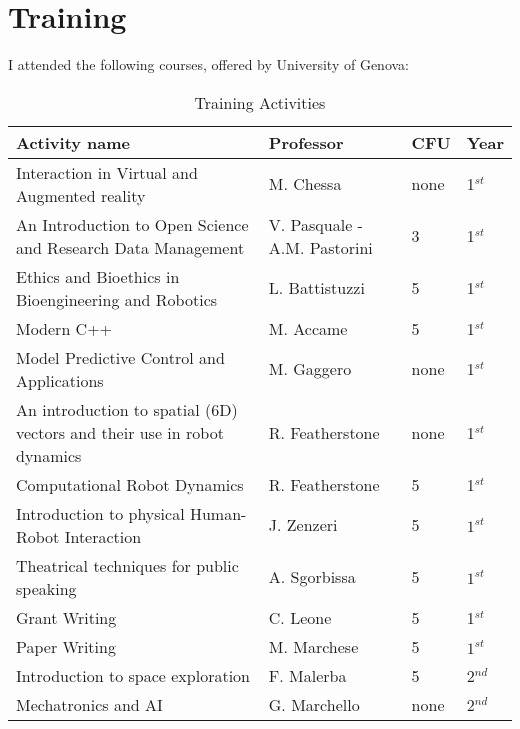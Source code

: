 \newpage
\section{Training}
I attended the following courses, offered by University of Genova:
\begin{table}[H]
	\begin{center}
		\renewcommand{\arraystretch}{1.3} %
		\setlength{\tabcolsep}{8pt} %
		\begin{tabular}{P{10cm} P{3cm} P{0.8cm} P{0.8cm}}
			\toprule
			\textbf{Activity name} & \textbf{Professor} & \textbf{CFU} & \textbf{Year} \\ 
			\midrule
			Interaction in Virtual and Augmented reality & M. Chessa & none & 1$^{st}$ \\
			\midrule
			An Introduction to Open Science and Research Data Management & V. Pasquale - A.M. Pastorini & 3 & 1$^{st}$ \\ 
			\midrule
			Ethics and Bioethics in Bioengineering and Robotics & L. Battistuzzi & 5 & 1$^{st}$ \\
			\midrule
			Modern C++ & M. Accame & 5 & 1$^{st}$ \\
			\midrule
			Model Predictive Control and Applications & M. Gaggero & none & 1$^{st}$ \\
			\midrule
			An introduction to spatial (6D) vectors and their use in robot dynamics & R. Featherstone & none & 1$^{st}$ \\ 
			\midrule
			Computational Robot Dynamics & R. Featherstone & 5 & 1$^{st}$ \\ 
			\midrule
			Introduction to physical Human-Robot Interaction & J. Zenzeri & 5 & $1^{st}$ \\	
			\midrule
			Theatrical techniques for public speaking & A. Sgorbissa & 5 & $1^{st}$ \\ 
			\bottomrule
			Grant Writing & C. Leone & 5 & 1$^{st}$ \\ 
			\midrule
			Paper Writing & M. Marchese & 5 & $1^{st}$ \\ 
			\midrule 
			Introduction to space exploration & F. Malerba & 5 & 2$^{nd}$ \\
			\midrule
			Mechatronics and AI & G. Marchello & none & 2$^{nd}$\\
			\bottomrule
		\end{tabular}
	\end{center}
	\caption{Training Activities}
\end{table}

